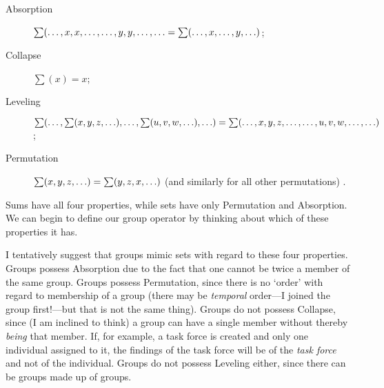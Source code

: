 \documentclass[11pt]{article}
\begin{document}
\begin{spacing}{1.5}
\begin{description}
  \item[Absorption] $\sum (\mathellipsis, x, x, \mathellipsis,
    \mathellipsis, y, y, \mathellipsis, \mathellipsis = \sum (
    \mathellipsis, x, \mathellipsis, y, \mathellipsis )$;
\item[Collapse] $\sum (x) = x$;
\item[Leveling] $\sum (\mathellipsis, \sum (x, y, z, \mathellipsis ),
  \mathellipsis, \sum (u, v, w, \mathellipsis ), \mathellipsis ) \\ =
  \sum (\mathellipsis, x, y, z, \mathellipsis, \mathellipsis, u, v, w,
  \mathellipsis, \mathellipsis )$;
\item[Permutation] $\sum (x, y, z, \mathellipsis ) = \sum (y, z, x,
  \mathellipsis )$ (and similarly for all other permutations)
  \citep[573]{fine2010}.
\end{description}

Sums have all four properties, while sets have only Permutation and
Absorption.  We can begin to define our group operator by thinking
about which of these properties it has.

I tentatively suggest that groups mimic sets with regard to these
four properties.  Groups possess Absorption due to the fact that one
cannot be twice a member of the same group.  Groups possess
Permutation, since there is no `order' with regard to membership of a
group (there may be {\em temporal} order---I joined the group
first!---but that is not the same thing).  Groups do not possess
Collapse, since (I am inclined to think) a group can have a single
member without thereby {\em being} that member.  If, for example, a
task force is created and only one individual assigned to it, the
findings of the task force will be of the {\em task force} and not of
the individual.  Groups do not possess Leveling either, since there
can be groups made up of groups.




\end{spacing}
\end{document}
